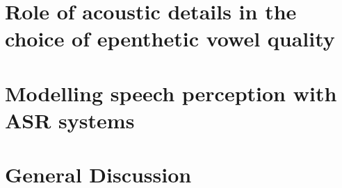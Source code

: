 \documentclass[12pt, twoside]{report}
\begin{document}
\chapter{Role of acoustic details in the choice of epenthetic vowel quality}


\chapter{Modelling speech perception with ASR systems}


\chapter{General Discussion}





\appendix
\fancyhead{}
\fancyhead[RO,LE]{\nouppercase{\leftmark}}
\fancyfoot{}
\fancyfoot[LE,RO]{\thepage}
\end{document}

